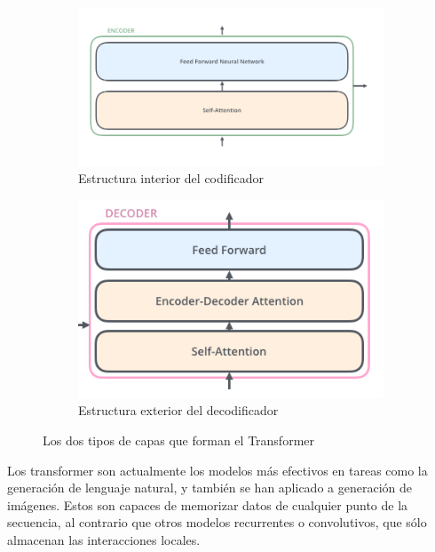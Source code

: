 \begin{figure}[H]
\centering
    \begin{subfigure}{.85\textwidth}
        \centering
        \includegraphics[width=1\linewidth]{imagenes/transformer_encoder.png}
        \caption{Estructura interior del codificador}
        \label{fig:encoder}
    \end{subfigure}%

    \bigskip

    \begin{subfigure}{.5\textwidth}
        \centering
        \includegraphics[width=1\linewidth]{imagenes/transformer_decoder.png}
        \caption{Estructura exterior del decodificador}
        \label{fig:decoder}
    \end{subfigure}

    \caption{Los dos tipos de capas que forman el Transformer \cite{transformers}}
\end{figure}


Los transformer son actualmente los modelos más efectivos en tareas como la generación de lenguaje natural, y también se han aplicado a generación de imágenes. Estos son capaces de memorizar datos de cualquier punto de la secuencia, al contrario que otros modelos recurrentes o convolutivos, que sólo almacenan las interacciones locales. \cite{transformers}



